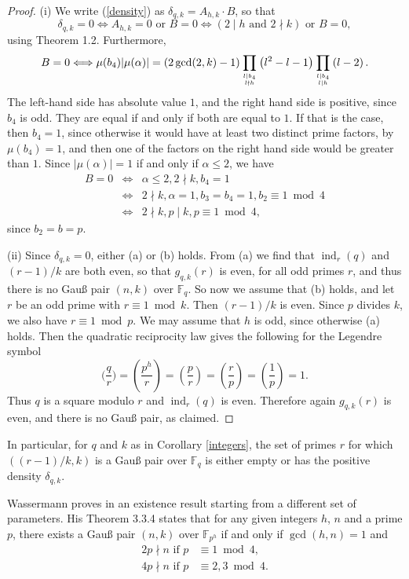\documentclass[twoside,final,reqno,noamsfonts]{birkartspecial}
\begin{document}
\begin{proof}
(i) We write (\ref{density}) as $\delta_{q,k}=A_{h,k}\cdot B$,
so that
$$
\delta_{q,k}=0\Longleftrightarrow A_{h,k}=0  {\text{ or }}
B=0\Longleftrightarrow (2 \mid h {\text{ and }} 2\nmid k) {\text{ or }}
B=0,
$$
using Theorem 1.2. Furthermore,
$$
B=0\Longleftrightarrow
{\mu(b_4) | \mu(\alpha)|}=
\left({2 \gcd (2,k)-1}\right)\prod_{\genfrac{}{}{0pt}{}{l\mid b_4}{l\nmid h}}
\left({l^2-l-1}\right)
\prod_{\genfrac{}{}{0pt}{}{l\mid b_4}{l\mid h}}\left({l-2}\right).
$$
The left-hand side has absolute value $1$, and the right hand side
is positive, since $b_{4}$ is odd. They are equal if and only if
both are equal to $1$. If that is the case, then $b_{4}=1$, since
otherwise it would have at least two distinct prime factors, by
$\mu(b_{4})=1$, and then one of the factors on the right hand side
would be greater than $1$. Since $|\mu(\alpha)|=1$ if and only if
$\alpha\le 2$, we have
\begin{eqnarray*}
B=0 & \Longleftrightarrow & \alpha\le 2, 2\nmid k, b_{4}=1\\
& \Longleftrightarrow & 2\nmid k,\alpha =1, b_{3}=b_{4}=1, b_{2}\equiv
1\bmod 4\\
& \Longleftrightarrow &  2\nmid k, p \mid k, p\equiv 1 \bmod 4,
\end{eqnarray*}
since $b_{2}=b=p$.

(ii) Since $\delta_{q,k} =0$,  either (a) or (b)
holds. From (a) we find that $\operatorname{ind}_r (q)$ and
$(r-1)/k$ are both even, so that $g_{q,k}(r)$ is even, for all
odd primes $r$, and thus there is no Gau{\ss} pair $(n,k)$
over ${\mathbb F}_{q}$. So now we assume that (b) holds, and let
$r$ be an odd prime with $r\equiv 1\bmod k$. Then $(r-1)/k$ is even.
Since $p$ divides $k$, we also have $r\equiv 1\bmod p$.
We may assume that $h$ is odd, since otherwise (a) holds.
Then the quadratic reciprocity law gives the following for the
Legendre symbol
$$
\biggl(\frac{q}{r}\biggr)=
\left(\frac{p^h}{r}\right)=\left(\frac{p}{r}\right)=\left(\frac{r}{p}\right)=\left(\frac{1}
{p}\right)=1.
$$
Thus $q$ is a square modulo $r$ and  $\operatorname{ind}_r (q)$
is even. Therefore again $g_{q,k}(r)$ is even, and there is no
Gau{\ss} pair, as claimed.
\end{proof}
In particular, for $q$ and $k$ as in Corollary \ref{integers}, the set of
primes $r$ for which $((r-1)/k,k)$ is a Gau{\ss} pair over ${\mathbb F}_{q}$
is either empty or has the positive density $\delta_{q,k}$.

Wassermann proves in
\cite{was93} an existence result starting from a different
set of parameters. His Theorem 3.3.4 states that for any given
integers $h$, $n$ and a prime $p$, there exists a Gau{\ss} pair
$(n,k)$ over ${\mathbb F}_{p^{h}}$ if and only if $\gcd(h,n)=1$
and
\begin{align*}
2p\nmid n \text{ if } p &  \equiv 1\bmod 4,\\
4p\nmid n \text{ if } p &  \equiv2,3\bmod 4.
\end{align*}
\end{document}
